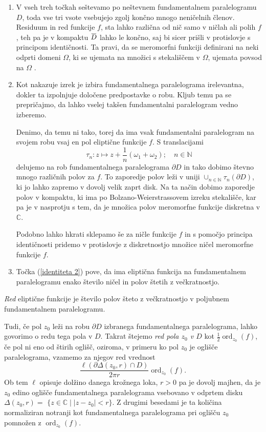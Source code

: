 \documentclass[mat1]{fmfdelo}
\newcommand{\N}{\mathbb N}
\newcommand{\C}{\mathbb C}
\newcommand{\om}{\omega}
\newcommand{\ord}[2]{\operatorname{ord}_{#1}(#2)}
\newcommand{\ols}[1]{\mskip.5\thinmuskip\overline{\mskip-.5\thinmuskip {#1} \mskip-.5\thinmuskip}\mskip.5\thinmuskip} %
\theoremstyle{definition}
\begin{document}
\begin{opomba}
    \label{liouville opomba}
    \begin{enumerate}
        \item
        V vseh treh točkah seštevamo po neštevnem fundamentalnem paralelogramu $D$, toda vse tri vsote vsebujejo zgolj končno mnogo neničelnih členov. Residuum in red funkcije $f$, sta lahko različna od nič samo v ničlah ali polih $f$, teh pa je v kompaktu $\ols{D}$ lahko le končno, saj bi sicer prišli v protislovje s principom identičnosti. Ta pravi, da se meromorfni funkciji definirani na neki odprti domeni $\Omega$, ki se ujemata na množici s stekališčem v $\Omega$, ujemata povsod na $\Omega$ \cite[]{}.
        \item 
        Kot nakazuje izrek je izbira fundamentalnega paralelograma irelevantna, dokler ta izpolnjuje določene predpostavke o robu. Kljub temu pa se prepričajmo, da lahko vselej takšen fundamentalni paralelogram vedno izberemo. 

        Denimo, da temu ni tako, torej da ima vsak fundamentalni paralelogram na svojem robu vsaj en pol eliptične funkcije $f$. S translacijami
        \[
            \tau_n : z \mapsto z + \frac{1}{n}(\om_1 + \om_2); \quad n\in \N
        \]
        delujemo na rob fundamentalnega paralelograma $\partial D$ in tako dobimo števno mnogo različnih polov za $f$. To zaporedje polov leži v uniji $\cup_{n \in \N} \tau_n(\partial D)$, ki jo lahko zapremo v dovolj velik zaprt disk. Na ta način dobimo zaporedje polov v kompaktu, ki ima po Bolzano-Weierstrassovem izreku stekališče, kar pa je v nasprotju s tem, da je množica polov meromorfne funkcije diskretna v $\C$. 
        
        Podobno lahko hkrati sklepamo še za ničle funkcije $f$ in s pomočjo principa identičnosti pridemo v protislovje z diskretnostjo množice ničel meromorfne funkcije $f$.
        \item 
        Točka (\ref{identiteta 2}) pove, da ima eliptična funkcija na fundamentalnem paralelogramu enako število ničel in polov štetih z večkratnostjo. 
    \end{enumerate}
\end{opomba}

\begin{definicija}
    \emph{Red} eliptične funkcije je število polov šteto z večkratnostjo v poljubnem fundamentalnem paralelogramu. 
\end{definicija}

Tudi, če pol $z_0$ leži na robu $\partial D$ izbranega fundamentalnega paralelograma, lahko govorimo o redu tega pola v $D$. Takrat štejemo \emph{red pola $z_0$ v $D$} kot $\frac{1}{2}\ord{z_0}{f}$, če pol ni eno od štirih oglišč, oziroma, v primeru ko pol $z_0$ je oglišče paralelograma, vzamemo za njegov red vrednost
\[
    \frac{\ell(\partial \Delta(z_0, r) \cap D)}{2 \pi r}\ord{z_0}{f}.
\]
Ob tem $\ell$ opisuje dolžino danega krožnega loka, $r > 0$ pa je dovolj majhen, da je $z_0$ edino oglišče fundamentalnega paralelograma vsebovano v odprtem disku ${\Delta(z_0, r) =}$ ${\{z \in \C \mid \left\lvert z - z_0 \right\rvert < r\}}$. Z drugimi besedami je ta količina normaliziran notranji kot fundamentalnega paralelograma pri oglišču $z_0$ pomnožen z $\ord{z_0}{f}$.  
\end{document}
